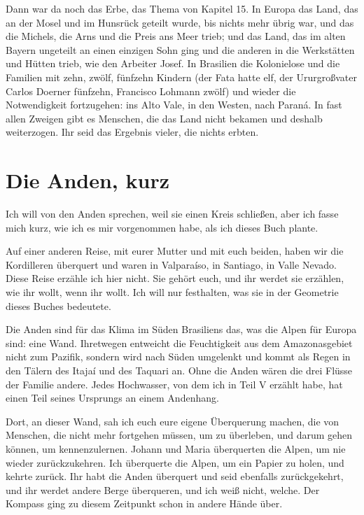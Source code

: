 \documentclass[
  ngerman,
  11pt,
  openany]{book}
\begin{document}
Dann war da noch das Erbe, das Thema von Kapitel 15. In Europa das Land,
das an der Mosel und im Hunsrück geteilt wurde, bis nichts mehr übrig
war, und das die Michels, die Arns und die Preis ans Meer trieb; und das
Land, das im alten Bayern ungeteilt an einen einzigen Sohn ging und die
anderen in die Werkstätten und Hütten trieb, wie den Arbeiter Josef. In
Brasilien die Kolonielose und die Familien mit zehn, zwölf, fünfzehn
Kindern (der Fata hatte elf, der Ururgroßvater Carlos Doerner fünfzehn,
Francisco Lohmann zwölf) und wieder die Notwendigkeit fortzugehen: ins
Alto Vale, in den Westen, nach Paraná. In fast allen Zweigen gibt es
Menschen, die das Land nicht bekamen und deshalb weiterzogen. Ihr seid
das Ergebnis vieler, die nichts erbten.

\section{Die Anden, kurz}\label{die-anden-kurz}

Ich will von den Anden sprechen, weil sie einen Kreis schließen, aber
ich fasse mich kurz, wie ich es mir vorgenommen habe, als ich dieses
Buch plante.

Auf einer anderen Reise, mit eurer Mutter und mit euch beiden, haben wir
die Kordilleren überquert und waren in Valparaíso, in Santiago, in Valle
Nevado. Diese Reise erzähle ich hier nicht. Sie gehört euch, und ihr
werdet sie erzählen, wie ihr wollt, wenn ihr wollt. Ich will nur
festhalten, was sie in der Geometrie dieses Buches bedeutete.

Die Anden sind für das Klima im Süden Brasiliens das, was die Alpen für
Europa sind: eine Wand. Ihretwegen entweicht die Feuchtigkeit aus dem
Amazonasgebiet nicht zum Pazifik, sondern wird nach Süden umgelenkt und
kommt als Regen in den Tälern des Itajaí und des Taquari an. Ohne die
Anden wären die drei Flüsse der Familie andere. Jedes Hochwasser, von
dem ich in Teil V erzählt habe, hat einen Teil seines Ursprungs an einem
Andenhang.

Dort, an dieser Wand, sah ich euch eure eigene Überquerung machen, die
von Menschen, die nicht mehr fortgehen müssen, um zu überleben, und
darum gehen können, um kennenzulernen. Johann und Maria überquerten die
Alpen, um nie wieder zurückzukehren. Ich überquerte die Alpen, um ein
Papier zu holen, und kehrte zurück. Ihr habt die Anden überquert und
seid ebenfalls zurückgekehrt, und ihr werdet andere Berge überqueren,
und ich weiß nicht, welche. Der Kompass ging zu diesem Zeitpunkt schon
in andere Hände über.
\end{document}
